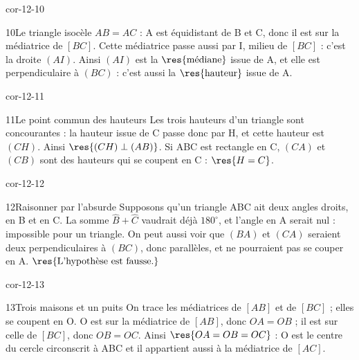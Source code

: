 \begin{blocLivre}{cor-12-10}\begin{corrige}{10}{Le triangle isocèle}
$AB=AC$ : A est équidistant de B et C, donc il est sur la médiatrice de $[BC]$. Cette médiatrice passe aussi par I, milieu de $[BC]$ : c’est la droite $(AI)$. Ainsi $(AI)$ est la $\res{\text{médiane}}$ issue de A, et elle est perpendiculaire à $(BC)$ : c’est aussi la $\res{\text{hauteur}}$ issue de A.
\label{fig-cor-12-10}
\end{corrige}\end{blocLivre}
\begin{blocLivre}{cor-12-11}\begin{corrige}{11}{Le point commun des hauteurs}
Les trois hauteurs d’un triangle sont concourantes : la hauteur issue de C passe donc par H, et cette hauteur est $(CH)$. Ainsi $\res{(CH)\perp(AB)}$. Si ABC est rectangle en C, $(CA)$ et $(CB)$ sont des hauteurs qui se coupent en C : $\res{H=C}$.
\label{fig-cor-12-11}
\end{corrige}\end{blocLivre}
\begin{blocLivre}{cor-12-12}\begin{corrige}{12}{Raisonner par l’absurde}
Supposons qu’un triangle ABC ait deux angles droits, en B et en C. La somme $\widehat B+\widehat C$ vaudrait déjà $180^\circ$, et l’angle en A serait nul : impossible pour un triangle. On peut aussi voir que $(BA)$ et $(CA)$ seraient deux perpendiculaires à $(BC)$, donc parallèles, et ne pourraient pas se couper en A. $\res{\text{L’hypothèse est fausse.}}$
\label{fig-cor-12-12}
\end{corrige}\end{blocLivre}
\begin{blocLivre}{cor-12-13}\begin{corrige}{13}{Trois maisons et un puits}
On trace les médiatrices de $[AB]$ et de $[BC]$ ; elles se coupent en O. O est sur la médiatrice de $[AB]$, donc $OA=OB$ ; il est sur celle de $[BC]$, donc $OB=OC$. Ainsi $\res{OA=OB=OC}$ : O est le centre du cercle circonscrit à ABC et il appartient aussi à la médiatrice de $[AC]$.
\label{fig-cor-12-13}
\end{corrige}\end{blocLivre}
